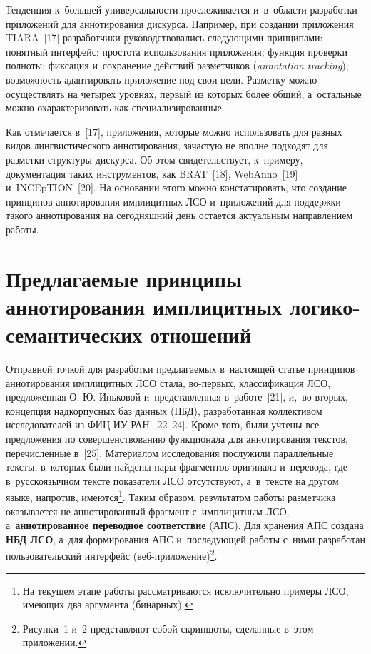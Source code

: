 \begin{multicols}{2}
Тенденция к~большей универсальности прослеживается и~в~об\-ласти 
разработки приложений для аннотирования дискурса. Например, при 
создании приложения TIARA~[17] разработчики руководствовались 
следующими принципами: понятный интерфейс; простота использования 
приложения; функция проверки полноты; фиксация и~сохранение действий 
разметчиков (\textit{annotation tracking}); возможность адаптировать 
приложение под свои цели. Разметку можно осуществлять на четырех 
уровнях, первый из которых более общий, а~остальные можно 
охарактеризовать как специализированные.

Как отмечается в~[17], приложения, которые можно использовать для разных 
видов лингвистического аннотирования, зачастую не вполне подходят для 
разметки структуры дискурса. Об этом свидетельствует, к~примеру, 
документация таких инструментов, как BRAT~[18], \mbox{WebAnno}~[19] 
и~\mbox{INCEpTION}~[20]. На основании этого можно констатировать, что 
создание принципов аннотирования имплицитных ЛСО и~приложений для 
поддержки такого аннотирования на сегодняшний день остается актуальным 
направлением работы.

\vspace*{-9pt}

\section{Предлагаемые принципы аннотирования имплицитных 
логико-семантических отношений}

\vspace*{-3pt}

Отправной точкой для разработки предлагаемых в~настоящей статье 
принципов аннотирования имплицитных ЛСО стала, во-пер\-вых, 
классификация ЛСО, предложенная О. Ю. Иньковой и~пред\-став\-лен\-ная в~работе~[21], и,~во-вто\-рых, концепция надкорпусных баз данных
(НБД), 
разработанная коллективом исследователей из ФИЦ ИУ РАН~[22--24]. 
Кроме того, были учтены все предложения по совершенствованию 
функционала для аннотирования текс\-тов, перечисленные в~[25]. Материалом 
исследования послужили параллельные текс\-ты, в~которых были найдены 
пары фрагментов оригинала и~перевода, где в~русскоязычном текс\-те 
показатели ЛСО отсутствуют, а~в~текс\-те на другом языке, напротив, 
имеются\footnote{На текущем этапе работы рассматриваются исключительно примеры ЛСО, 
имеющих два аргумента (бинарных).}. Таким образом, результатом работы 
разметчика оказывается не аннотированный фрагмент с~имплицитным ЛСО, 
а~\textbf{аннотированное переводное соответствие} (АПС). Для хранения 
АПС создана \textbf{НБД ЛСО}, а~для 
формирования АПС и~последующей работы с~ними разработан 
пользовательский интерфейс (веб-при\-ло\-же\-ние)\footnote{Рисунки~1 и~2 
представляют собой скриншоты, сделанные в~этом приложении.}.


\end{multicols}
